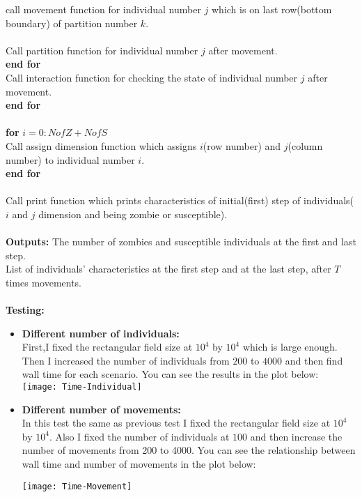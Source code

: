 \documentclass[12pt]{article}
\newcommand\tab[1][1cm]{\hspace*{#1}}
\begin{document}
\tab \tab call movement function for individual number $j$ which is on last \tab \tab row(bottom boundary) of partition number $k$. \\\\
\tab \tab Call partition function for individual number $j$ after movement.\\
\tab \textbf{end for}\\
\tab Call interaction function for checking the state of individual number $j$ \tab after movement.\\
\textbf{end for}\\\\
\textbf{for} $i=0:NofZ+NofS$\\
\tab Call assign dimension function which assigns $i$(row number) and $j$(column \tab number) to individual number $i$.\\
\textbf{end for}\\\\
Call print function which prints characteristics of initial(first) step of individuals($i$ and $j$ dimension and being zombie or susceptible).\\\\
\textbf{Outputs:} The number of zombies and susceptible individuals at the first and last step.\\
List of individuals' characteristics at the first step and at the last step, after $T$ times movements.\\\\
\textbf{Testing:}
\begin{itemize}
\item \textbf{Different number of individuals:}\\
First,I fixed the rectangular field size at $10^4$ by $10^4$ which is large enough. Then I increased the number of individuals from $200$ to $4000$ and then find wall time for each scenario.
You can see the results in the plot below:\\

\hfill \break
{\centering
\texttt{[image: Time-Individual]}\\}
\hfill \break
\item \textbf{Different number of movements:}\\
In this test the same as previous test I fixed the rectangular field size at $10^4$ by $10^4$. Also I fixed the number of individuals at $100$ and then increase the number of movements from 200 to 4000. You can see the relationship between wall time and number of movements in the plot below:

\hfill \break
{\centering
\texttt{[image: Time-Movement]}\\}
\hfill \break
\end{itemize}
\end{document}
